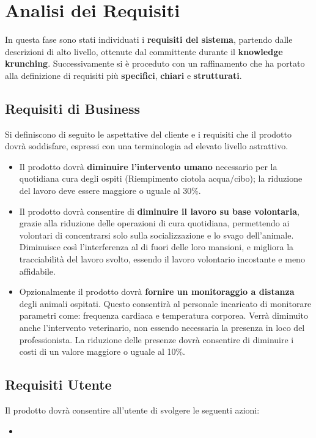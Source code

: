 
\chapter{Analisi dei Requisiti}
In questa fase sono stati individuati i \textbf{requisiti del sistema}, partendo dalle descrizioni di alto livello, ottenute dal committente durante il \textbf{knowledge krunching}. Successivamente si è proceduto con un raffinamento che ha portato alla definizione di requisiti più \textbf{specifici}, \textbf{chiari} e \textbf{strutturati}.
	\section{Requisiti di Business}
	Si definiscono di seguito le aspettative del cliente e i requisiti che il prodotto dovrà soddisfare, espressi con una terminologia ad elevato livello astrattivo.
        \begin{itemize}
            \item Il prodotto dovrà \textbf{diminuire l'intervento umano} necessario per la quotidiana cura degli ospiti (Riempimento ciotola acqua/cibo); la riduzione del lavoro deve essere maggiore o uguale al 30\%.
            \item Il prodotto dovrà consentire di \textbf{diminuire il lavoro su base volontaria}, grazie alla riduzione delle operazioni di cura quotidiana, permettendo ai volontari di concentrarsi solo sulla socializzazione e lo svago dell'animale.
            Diminuisce così l'interferenza al di fuori delle loro mansioni, e migliora la tracciabilità del lavoro svolto, essendo il lavoro volontario incostante e meno affidabile.
            \item Opzionalmente il prodotto dovrà \textbf{fornire un monitoraggio a distanza} degli animali ospitati.
            Questo consentirà al personale incaricato di monitorare parametri come: frequenza cardiaca e temperatura corporea. Verrà diminuito anche l'intervento veterinario, non essendo necessaria la presenza in loco del professionista. La riduzione delle presenze dovrà consentire di diminuire i costi di un valore maggiore o uguale al 10\%.
        \end{itemize}
	
	\section{Requisiti Utente}
	Il prodotto dovrà consentire all'utente di svolgere le seguenti azioni:
	   \begin{itemize}
            \item %
        \end{itemize}
